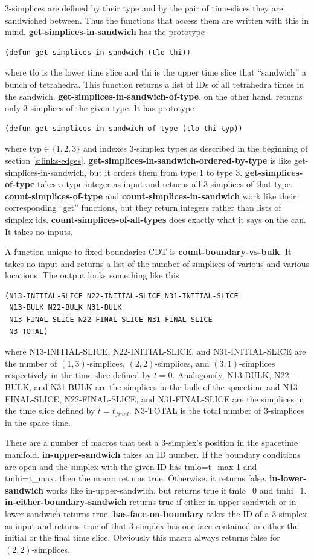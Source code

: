 \message{ !name(programmers_guide.tex)}\documentclass[12pt]{article}
\begin{document}
3-simplices are defined by their type and by the pair of time-slices
they are sandwiched between. Thus the functions that access them are
written with this in mind. \textbf{get-simplices-in-sandwich} has the
prototype
\begin{lstlisting}
(defun get-simplices-in-sandwich (tlo thi))
\end{lstlisting}
where tlo is the lower time slice and thi is the upper time slice that
``sandwich'' a bunch of tetrahedra. This function returns a list of IDs of
all tetrahedra times in the
sandwich. \textbf{get-simplices-in-sandwich-of-type}, on the other
hand, returns only 3-simplices of the given type. It has prototype
\begin{lstlisting}
(defun get-simplices-in-sandwich-of-type (tlo thi typ))
\end{lstlisting}
where typ$\in\{1,2,3\}$ and indexes 3-simplex types as described in
the beginning of section
\ref{s:links-edges}. \textbf{get-simplices-in-sandwich-ordered-by-type}
is like get-simplices-in-sandwich, but it orders them from type 1 to
type 3. \textbf{get-simplices-of-type} takes a type integer as input
and returns all 3-simplices of that
type. \textbf{count-simplices-of-type} and
\textbf{count-simplices-in-sandwich} work like their corresponding
``get'' functions, but they return integers rather than lists of
simplex ids. \textbf{count-simplices-of-all-types} does exactly what
it says on the can. It takes no inputs.

A function unique to fixed-boundaries CDT is
\textbf{count-boundary-vs-bulk}. It takes no input and returns a list
of the number of simplices of various and various locations. The
output looks something like this
\begin{lstlisting}
(N13-INITIAL-SLICE N22-INITIAL-SLICE N31-INITIAL-SLICE
 N13-BULK N22-BULK N31-BULK
 N13-FINAL-SLICE N22-FINAL-SLICE N31-FINAL-SLICE
 N3-TOTAL)
\end{lstlisting}
where N13-INITIAL-SLICE, N22-INITIAL-SLICE, and N31-INITIAL-SLICE are
the number of $(1,3)$-simplices, $(2,2)$-simplices, and
$(3,1)$-simplices respectively in the time slice defined by
$t=0$. Analogously, N13-BULK, N22-BULK, and N31-BULK are the simplices
in the bulk of the spacetime and N13-FINAL-SLICE, N22-FINAL-SLICE, and
N31-FINAL-SLICE are the simplices in the time slice defined by
$t=t_{final}$. N3-TOTAL is the total number of 3-simplices in the
space time.

There are a number of macros that test a 3-simplex's position in the
spacetime manifold. \textbf{in-upper-sandwich} takes an ID number. If
the boundary conditions are open and the simplex with the given ID has
tmlo=t\_max-1 and tmhi=t\_max, then the macro returns true. Otherwise,
it returns false. \textbf{in-lower-sandwich} works like
in-upper-sandwich, but returns true if tmlo=0 and
tmhi=1. \textbf{in-either-boundary-sandwich} returns true if either
in-upper-sandwich or in-lower-sandwich returns
true. \textbf{has-face-on-boundary} takes the ID of a 3-simplex as
input and returns true of that 3-simplex has one face contained in
either the initial or the final time slice. Obviously this macro
always returns false for $(2,2)$-simplices.
\end{document}
